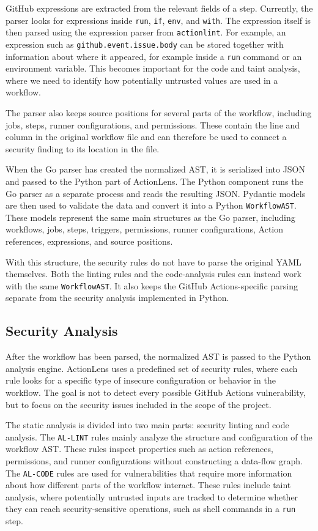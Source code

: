 \documentclass{article}
\begin{document}
GitHub expressions are extracted from the relevant fields of a step. Currently, the parser looks for expressions inside \texttt{run}, \texttt{if}, \texttt{env}, and \texttt{with}. The expression itself is then parsed using the expression parser from \texttt{actionlint}. For example, an expression such as \texttt{github.event.issue.body} can be stored together with information about where it appeared, for example inside a \texttt{run} command or an environment variable. This becomes important for the code and taint analysis, where we need to identify how potentially untrusted values are used in a workflow.

The parser also keeps source positions for several parts of the workflow, including jobs, steps, runner configurations, and permissions. These contain the line and column in the original workflow file and can therefore be used to connect a security finding to its location in the file.

When the Go parser has created the normalized AST, it is serialized into JSON and passed to the Python part of ActionLens. The Python component runs the Go parser as a separate process and reads the resulting JSON. Pydantic models are then used to validate the data and convert it into a Python \texttt{WorkflowAST}. These models represent the same main structures as the Go parser, including workflows, jobs, steps, triggers, permissions, runner configurations, Action references, expressions, and source positions.

With this structure, the security rules do not have to parse the original YAML themselves. Both the linting rules and the code-analysis rules can instead work with the same \texttt{WorkflowAST}. It also keeps the GitHub Actions-specific parsing separate from the security analysis implemented in Python.

\subsection{Security Analysis}

After the workflow has been parsed, the normalized AST is passed to the Python analysis engine. ActionLens uses a predefined set of security rules, where each rule looks for a specific type of insecure configuration or behavior in the workflow. The goal is not to detect every possible GitHub Actions vulnerability, but to focus on the security issues included in the scope of the project.

The static analysis is divided into two main parts: security linting and code analysis. The \texttt{AL-LINT} rules mainly analyze the structure and configuration of the workflow AST. These rules inspect properties such as action references, permissions, and runner configurations without constructing a data-flow graph. The \texttt{AL-CODE} rules are used for vulnerabilities that require more information about how different parts of the workflow interact. These rules include taint analysis, where potentially untrusted inputs are tracked to determine whether they can reach security-sensitive operations, such as shell commands in a \texttt{run} step.
\end{document}
